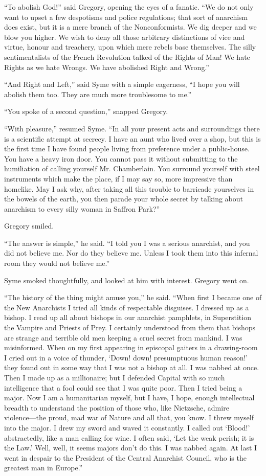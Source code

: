 “To abolish God!” said Gregory, opening the eyes of a fanatic. “We do not only want to upset a few despotisms and police regulations; that sort of anarchism does exist, but it is a mere branch of the Nonconformists. We dig deeper and we blow you higher. We wish to deny all those arbitrary distinctions of vice and virtue, honour and treachery, upon which mere rebels base themselves. The silly sentimentalists of the French Revolution talked of the Rights of Man! We hate Rights as we hate Wrongs. We have abolished Right and Wrong.”

“And Right and Left,” said Syme with a simple eagerness, “I hope you will abolish them too. They are much more troublesome to me.”

“You spoke of a second question,” snapped Gregory.

“With pleasure,” resumed Syme. “In all your present acts and surroundings there is a scientific attempt at secrecy. I have an aunt who lived over a shop, but this is the first time I have found people living from preference under a public-house. You have a heavy iron door. You cannot pass it without submitting to the humiliation of calling yourself Mr. Chamberlain. You surround yourself with steel instruments which make the place, if I may say so, more impressive than homelike. May I ask why, after taking all this trouble to barricade yourselves in the bowels of the earth, you then parade your whole secret by talking about anarchism to every silly woman in Saffron Park?”

Gregory smiled.

“The answer is simple,” he said. “I told you I was a serious anarchist, and you did not believe me. Nor do they believe me. Unless I took them into this infernal room they would not believe me.”

Syme smoked thoughtfully, and looked at him with interest. Gregory went on.

“The history of the thing might amuse you,” he said. “When first I became one of the New Anarchists I tried all kinds of respectable disguises. I dressed up as a bishop. I read up all about bishops in our anarchist pamphlets, in Superstition the Vampire and Priests of Prey. I certainly understood from them that bishops are strange and terrible old men keeping a cruel secret from mankind. I was misinformed. When on my first appearing in episcopal gaiters in a drawing-room I cried out in a voice of thunder, ‘Down! down! presumptuous human reason!’ they found out in some way that I was not a bishop at all. I was nabbed at once. Then I made up as a millionaire; but I defended Capital with so much intelligence that a fool could see that I was quite poor. Then I tried being a major. Now I am a humanitarian myself, but I have, I hope, enough intellectual breadth to understand the position of those who, like Nietzsche, admire violence⁠—the proud, mad war of Nature and all that, you know. I threw myself into the major. I drew my sword and waved it constantly. I called out ‘Blood!’ abstractedly, like a man calling for wine. I often said, ‘Let the weak perish; it is the Law.’ Well, well, it seems majors don’t do this. I was nabbed again. At last I went in despair to the President of the Central Anarchist Council, who is the greatest man in Europe.”

